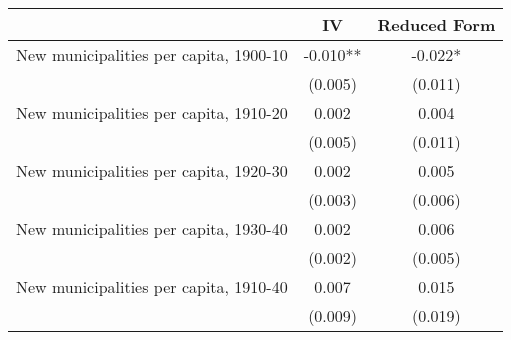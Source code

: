  \begin{tabular}{l*{2}{c}} \toprule
                &\multicolumn{1}{c}{IV}&\multicolumn{1}{c}{Reduced Form}\\
\midrule
New municipalities per capita, 1900-10&   -0.010** &   -0.022*  \\
                &  (0.005)   &  (0.011)   \\
\addlinespace
New municipalities per capita, 1910-20&    0.002   &    0.004   \\
                &  (0.005)   &  (0.011)   \\
\addlinespace
New municipalities per capita, 1920-30&    0.002   &    0.005   \\
                &  (0.003)   &  (0.006)   \\
\addlinespace
New municipalities per capita, 1930-40&    0.002   &    0.006   \\
                &  (0.002)   &  (0.005)   \\
\addlinespace
New municipalities per capita, 1910-40&    0.007   &    0.015   \\
                &  (0.009)   &  (0.019)   \\
       \bottomrule \end{tabular}
